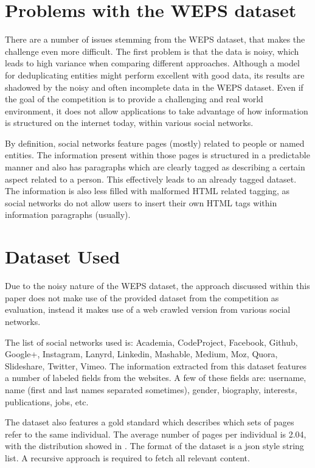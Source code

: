 \section{Problems with the WEPS dataset}
\label{section:weps-dataset-problems}
There are a number of issues stemming from the WEPS dataset, that makes the
challenge even more difficult. The first problem is that the data is noisy,
which leads to high variance when comparing different approaches. Although a
model for deduplicating entities might perform excellent with good data, its
results are shadowed by the noisy and often incomplete data in the WEPS dataset.
Even if the goal of the competition is to provide a challenging and real world
environment, it does not allow applications to take advantage of how information
is structured on the internet today, within various social networks.

By definition, social networks feature pages (mostly) related to people or
named entities. The information present within those pages is structured in a
predictable manner and also has paragraphs which are clearly tagged as describing
a certain aspect related to a person. This effectively leads to an already tagged
dataset. The information is also less filled with malformed HTML related tagging,
as social networks do not allow users to insert their own HTML tags within information
paragraphs (usually).

\section{Dataset Used}
\label{section:dataset-used}
Due to the noisy nature of the WEPS dataset, the approach discussed within
this paper does not make use of the provided dataset from the competition as
evaluation, instead it makes use of a web crawled version from various social
networks.

The list of social networks used is: Academia, CodeProject, Facebook, Github,
Google+, Instagram, Lanyrd, Linkedin,  Mashable, Medium, Moz, Quora, Slideshare,
Twitter, Vimeo. The information extracted from this dataset features a number of
labeled fields from the websites. A few of these fields are: username, name
(first and last names separated sometimes), gender, biography, interests, publications,
jobs, etc. 

The dataset also features a gold standard which describes which sets of pages
refer to the same individual. The average number of pages per individual is
2.04, with the distribution showed in .
The format of the dataset is a json style string list. A recursive approach is
required to fetch all relevant content.


